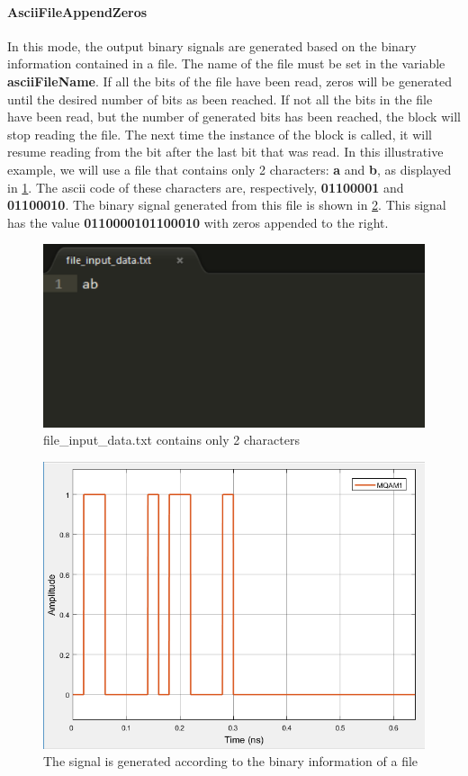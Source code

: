 \paragraph{AsciiFileAppendZeros}
In this mode, the output binary signals are generated based on the binary information contained in a file. The name of the file must be set in the variable \textbf{asciiFileName}. If all the bits of the file have been read, zeros will be generated until the desired number of bits as been reached.
If not all the bits in the file have been read, but the number of generated bits has been reached, the block will stop reading the file. The next time the instance of the block is called, it will resume reading from the bit after the last bit that was read.
In this illustrative example, we will use a file that contains only 2 characters: \textbf{a} and \textbf{b}, as displayed in \ref{fig:asciifileexample}. The ascii code of these characters are, respectively, \textbf{01100001} and \textbf{01100010}. The binary signal generated from this file is shown in \ref{fig:generatedsignalfile}. This signal has the value \textbf{0110000101100010} with zeros appended to the right.
%
\begin{figure}[h]
	\centering
\includegraphics[width=.6\linewidth]{./lib/binary_source/figures/file_input_data_binary_source}
\caption{file\_input\_data.txt contains only 2 characters}\label{fig:asciifileexample}
\end{figure}
%
\begin{figure}[h]
	\centering
\includegraphics[width=.8\linewidth]{./lib/binary_source/figures/generated_signal_file}
\caption{The signal is generated according to the binary information of a file}\label{fig:generatedsignalfile}
\end{figure}
%


